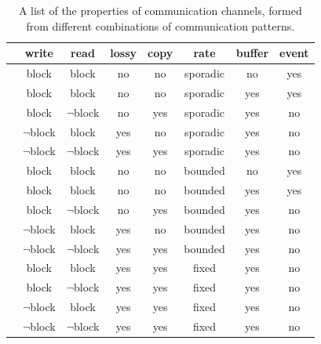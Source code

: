 \begin{table}[bht]
    \renewcommand{\arraystretch}{1.3}
    \TopTabSpace
    \caption{A list of the properties of communication channels, formed from different combinations of communication patterns.}
    \label{tab_pattern}
    \CaptionTabSpace
    \centering
    \begin{tabular}{c|*{7}{|c}}
                                  & write       & read        & lossy & copy & rate     & buffer & event \\
        \hline
        \hline
        \channel{->}{}            & block       & block       & no    & no   & sporadic & no     & yes   \\
        \hline
              & block       & block       & no    & no   & sporadic & yes    & yes   \\
             & block       & $\neg$block & no    & yes  & sporadic & yes    & no    \\
             & $\neg$block & block       & yes   & no   & sporadic & yes    & no    \\
            & $\neg$block & $\neg$block & yes   & yes  & sporadic & yes    & no    \\
        \hline
                & block       & block       & no    & no   & bounded  & no     & yes   \\
        \hline
           & block       & block       & no    & no   & bounded  & yes    & yes   \\
          & block       & $\neg$block & no    & yes  & bounded  & yes    & no    \\
          & $\neg$block & block       & yes   & no   & bounded  & yes    & no    \\
         & $\neg$block & $\neg$block & yes   & yes  & bounded  & yes    & no    \\
        \hline
                 & block       & block       & yes   & yes  & fixed    & yes    & no    \\
                & block       & $\neg$block & yes   & yes  & fixed    & yes    & no    \\
                & $\neg$block & block       & yes   & yes  & fixed    & yes    & no    \\
               & $\neg$block & $\neg$block & yes   & yes  & fixed    & yes    & no    \\
    \end{tabular}
    \BotTabSpace
\end{table}

